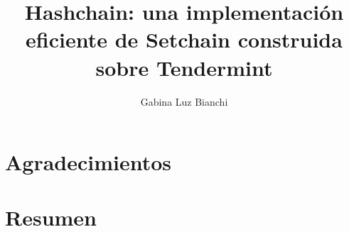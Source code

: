 \documentclass[a4paper, 11pt]{book}
\title{Hashchain: una implementación eficiente de Setchain construida sobre Tendermint}
\author{Gabina Luz Bianchi}
\begin{document}
\frontmatter %




\chapter{Agradecimientos}


\chapter{Resumen}


\tableofcontents{}

\mainmatter %
\end{document}
